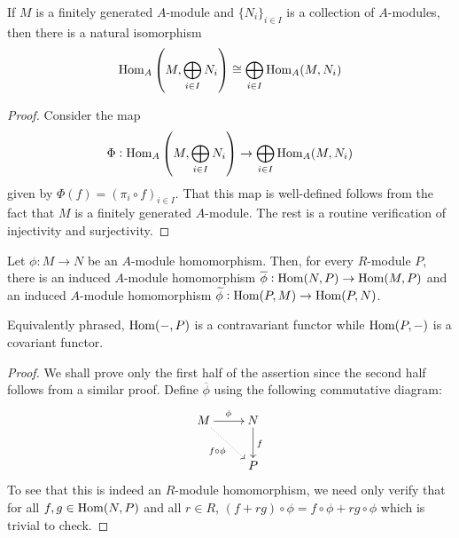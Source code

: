 \begin{proposition}
    If $M$ is a finitely generated $A$-module and $\{N_i\}_{i\in I}$ is a collection of $A$-modules, then there is a natural isomorphism
    \begin{equation*}
        \operatorname{Hom}_A\left(M, \bigoplus_{i\in I}N_i\right)\cong\bigoplus_{i\in I}\operatorname{Hom}_A(M, N_i)
    \end{equation*}
\end{proposition}
\begin{proof}
    Consider the map 
    \begin{equation*}
        \Phi:\operatorname{Hom}_A\left(M, \bigoplus_{i\in I}N_i\right)\to\bigoplus_{i\in I}\operatorname{Hom}_A(M, N_i)
    \end{equation*}
    given by $\Phi(f) = (\pi_i\circ f)_{i\in I}$. That this map is well-defined follows from the fact that $M$ is a finitely generated $A$-module. The rest is a routine verification of injectivity and surjectivity.
\end{proof}

\begin{theorem}
    Let $\phi: M\to N$ be an $A$-module homomorphism. Then, for every $R$-module $P$, there is an induced $A$-module homomorphism $\overline\phi:\operatorname{Hom}(N,P)\to\operatorname{Hom}(M,P)$ and an induced $A$-module homomorphism $\widetilde\phi:\operatorname{Hom}(P,M)\to\operatorname{Hom}(P,N)$. 
    
    Equivalently phrased, $\operatorname{Hom}(-,P)$ is a contravariant functor while $\operatorname{Hom}(P,-)$ is a covariant functor.
\end{theorem}
\begin{proof}
    We shall prove only the first half of the assertion since the second half follows from a similar proof. Define $\overline\phi$ using the following commutative diagram: 
    \begin{equation*}
    \xymatrix {
        M\ar[r]^{\phi}\ar@{.>}[rd]_{f\circ\phi} & N\ar[d]^f\\
        & P
    }
    \end{equation*}
    To see that this is indeed an $R$-module homomorphism, we need only verify that for all $f,g\in\operatorname{Hom}(N,P)$ and all $r\in R$, $(f + rg)\circ\phi = f\circ\phi + rg\circ\phi$ which is trivial to check.
\end{proof}


